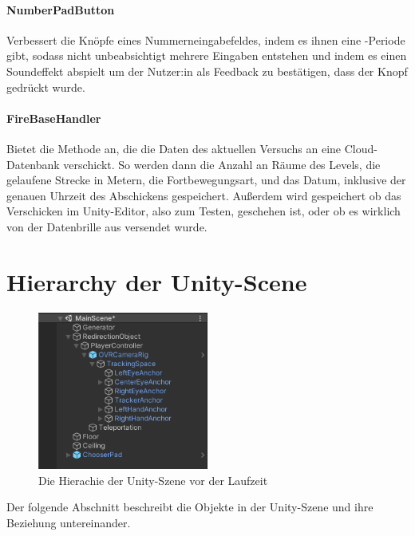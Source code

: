\begin{multicols*}{2}
    \paragraph{NumberPadButton}
    Verbessert die Knöpfe eines Nummerneingabefeldes, indem es ihnen eine -Periode gibt,
    sodass nicht unbeabsichtigt mehrere Eingaben entstehen und indem es einen Soundeffekt abspielt um der Nutzer:in als Feedback zu bestätigen, dass der Knopf gedrückt wurde. %

    \paragraph{FireBaseHandler}
    Bietet die Methode  an, die die Daten des aktuellen Versuchs an eine Cloud-Datenbank verschickt. So werden dann die Anzahl an Räume des Levels, die gelaufene Strecke in Metern, die Fortbewegungsart, und das Datum, inklusive der genauen Uhrzeit des Abschickens gespeichert. Außerdem wird gespeichert ob das Verschicken im Unity-Editor, also zum Testen, geschehen ist, oder ob es wirklich von der Datenbrille aus versendet wurde.
\end{multicols*}

\section{Hierarchy der Unity-Scene}\label{sec:hierarchy}

\begin{figure}[!h]
    \centering
    \includegraphics[width=0.5\textwidth]{images/hierarchy.png}
    \caption{Die Hierachie der Unity-Szene vor der Laufzeit}\label{figure:hierarchy}
\end{figure}

Der folgende Abschnitt beschreibt die Objekte in der Unity-Szene und ihre Beziehung untereinander.


